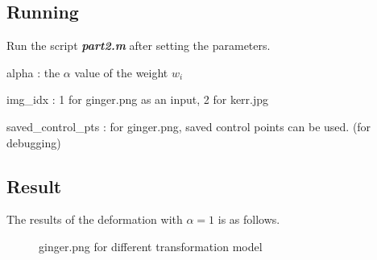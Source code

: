 \documentclass[paper=a4, fontsize=11pt]{scrartcl} %
\numberwithin{equation}{section} %
\numberwithin{figure}{section} %
\numberwithin{table}{section} %
\newcommand{\filename}[1]{\textbf{\textit{#1}}}
\begin{document}
\subsection{Running}

Run the script \filename{part2.m} after setting the parameters. 

\begin{paramdescription}
\item [alpha] : the $\alpha$ value of the weight $w_i$
\item [img\_idx] : 1 for ginger.png as an input, 2 for kerr.jpg
\item [saved\_control\_pts] : for ginger.png, saved control points can be used. (for debugging)  
\end{paramdescription}

\subsection{Result}

The results of the deformation with $\alpha = 1$ is as follows. 

\begin{figure}[H]
\caption{ginger.png for different transformation model\label{fig:simple}}
\centering
{}
\end{figure}
\end{document}
